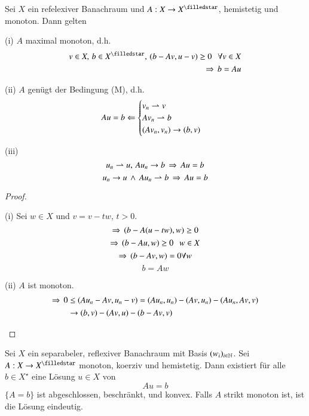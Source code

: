\begin{lem}[Minty]\label{4.5}
    Sei $X$ ein refelexiver Banachraum und $A:X\ra X^\star$, hemistetig und monoton. Dann gelten
    \begin{description}
        \item{(i)}
        $A$ maximal monoton, d.h.
        \begin{align*}
            v\in X, \, b\in X^\star, \, (b-Av,u-v) \geq 0 \qq \forall v\in X\\
                \Ra \,b=Au
        \end{align*}
        \item{(ii)}
        $A$ genügt der Bedingung (M), d.h.
        \[
            Au=b \Leftarrow \begin{cases} v_n \rightharpoonup v \\ Av_n\rightharpoonup b \\ (Av_n,v_n)\rightarrow (b,v)
        \end{cases}
        \]
        \item{(iii)}
        \[
            u_n \rightharpoonup u, \, Au_n\rightarrow b \, \Rightarrow \, Au=b
        \]
        \[
            u_n\rightarrow u \,\wedge \, Au_n \rightharpoonup b \, \Rightarrow \, Au=b
        \]
    \end{description}
\end{lem}

\begin{proof}
    \begin{description}
    \item{(i)}
    Sei $w\in X$ und $v=v-tw, \, t>0$.
    \[
        \Rightarrow \,(b-A(u-tw),w)\geq 0
    \]
    \[
        \Rightarrow\,(b-Au, w)\geq 0 \hspace{.25cm} w\in X
    \]
    \[
        \Rightarrow \,(b-Av,w)=0 \forall w
    \]
    \[
        b=Aw
    \]
    \item{(ii)}
    $A$ ist monoton.
    \begin{align*}
    \Rightarrow \, 0&\leq (Au_n-Av,u_n-v) = (Au_n,u_n)-(Av,u_n) - (Au_n,Av,v)\\
    &\rightarrow (b,v)-(Av,u)-(b-Av,v)
    \end{align*}
    \end{description}
\end{proof}

\begin{theorem}\label{4.6}
    Sei $X$ ein separabeler, reflexiver Banachraum mit Basis $(w_i)_{i\in \mathbb{N}}$. Sei $A:X\ra X^\star$
    monoton, koerziv und hemistetig. Dann existiert für alle $b\in X^\star$ eine Lösung $u\in X$ von
    \[ Au=b \]
    $\{A=b\}$ ist abgeschlossen, beschränkt, und konvex. Falls $A$ strikt monoton ist, ist die Lösung
    eindeutig.
\end{theorem}

